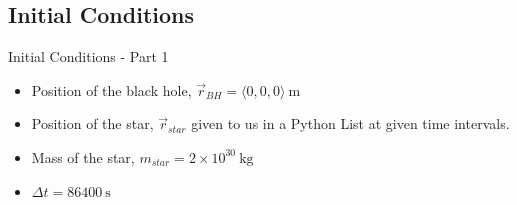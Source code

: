 





\subsection{Initial Conditions}
\begin{frame}{Initial Conditions - Part 1}
	\begin{itemize}
	\item Position of the black hole, \(\vec{r}_{BH} = \langle 0, 0, 0 \rangle\ \mathrm{m}\)
	\item Position of the star, \(\vec{r}_{star}\) given to us in a Python List at given time intervals.
    \item Mass of the star, \(m_{star} = 2\times 10^{30}\ \mathrm{kg}\)
    \item \(\Delta t = 86400\ \mathrm{s}\)
	\end{itemize}
\end{frame}

